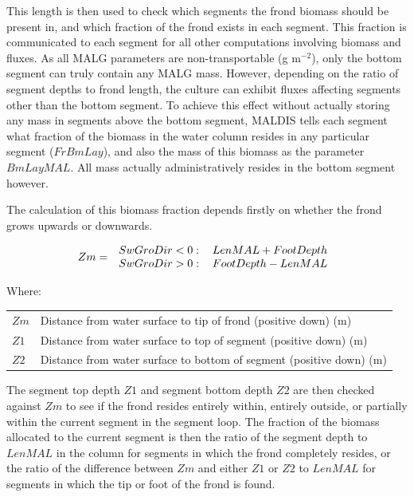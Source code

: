 \documentclass{deltares_manual}
\begin{document}
This length is then used to check which segments the frond biomass should be present in, and which fraction of the frond exists in each segment. This fraction is communicated to each segment for all other computations involving biomass and fluxes. As all MALG parameters are non-transportable (g m$^{-2}$), only the bottom segment can truly contain any MALG mass. However, depending on the ratio of segment depths to frond length, the culture can exhibit fluxes affecting segments other than the bottom segment. To achieve this effect without actually storing any mass in segments above the bottom segment, MALDIS tells each segment what fraction of the biomass in the water column resides in any particular segment ($FrBmLay$), and also the mass of this biomass as the parameter $BmLayMAL$. All mass actually administratively resides in the bottom segment however.

The calculation of this biomass fraction depends firstly on whether the frond grows upwards or downwards.

\begin{equation}
Zm =  
\left 
.\begin{tabular}{cc}
$SwGroDir < 0:$& $LenMAL + FootDepth$\\
$SwGroDir > 0:$& $FootDepth - LenMAL$\\
\end{tabular}
\right
.\end{equation}

Where:\\

\begin{tabular}{ll}
$Zm$ & Distance from water surface to tip of frond (positive down) (m)\\
$Z1$ & Distance from water surface to top of segment (positive down) (m)\\
$Z2$ & Distance from water surface to bottom of segment (positive down) (m)\\
\end{tabular}

The segment top depth $Z1$ and segment bottom depth $Z2$ are then checked against $Zm$ to see if the frond resides entirely within, entirely outside, or partially within the current segment in the segment loop. The fraction of the biomass allocated to the current segment is then the ratio of the segment depth to $LenMAL$ in the column for segments in which the frond completely resides, or the ratio of the difference between $Zm$ and either $Z1$ or $Z2$ to $LenMAL$ for segments in which the tip or foot of the frond is found.
\pagebreak
\end{document}
